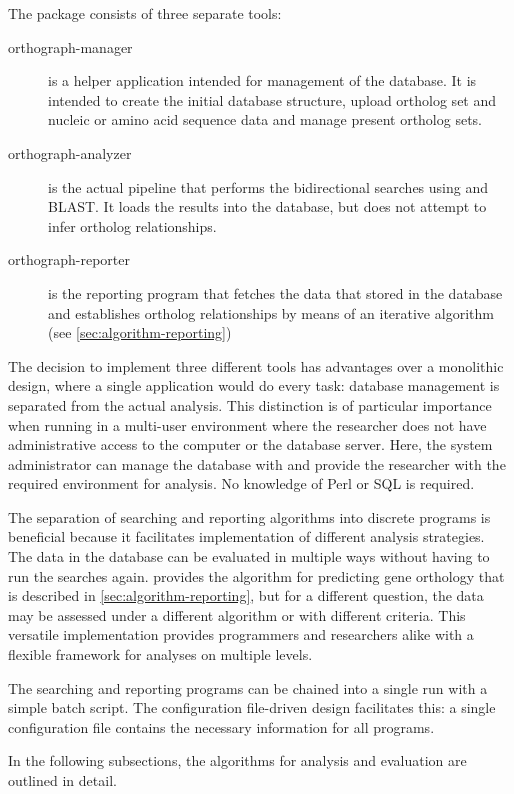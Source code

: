 \label{sec:algorithm}
The \pname package consists of three separate tools:

\begin{description}
	\item[orthograph-manager] is a helper application intended for management of
		the database. It is intended to create the initial database structure, upload
		ortholog set and nucleic or amino acid sequence data and manage present
		ortholog sets.
	\item[orthograph-analyzer] is the actual pipeline that performs the
		bidirectional searches using  and BLAST. It loads the
		results into the database, but does not attempt to infer ortholog
		relationships. 
	\item[orthograph-reporter] is the reporting program that fetches the data that
		 stored in the database and establishes ortholog
		relationships by means of an iterative algorithm (see
		\autoref{sec:algorithm-reporting})
\end{description}

The decision to implement three different tools  has advantages over a
monolithic design, where a single application would do every task: database
management is separated from the actual analysis. This distinction is of
particular importance when running \pname in a multi-user environment where the
researcher does not have administrative access to the computer or the database
server. Here, the system administrator can manage the database with
 and provide the researcher with the required
environment for analysis. No knowledge of Perl or SQL is required.

The separation of searching and reporting algorithms into discrete programs is
beneficial because it facilitates implementation of different analysis
strategies. The data in the database can be evaluated in multiple ways without
having to run the searches again.  provides the algorithm for
predicting gene orthology that is described in
\autoref{sec:algorithm-reporting}, but for a different question, the data may be
assessed under a different algorithm or with different criteria. This versatile
implementation provides programmers and researchers alike with a flexible
framework for analyses on multiple levels. 

The searching and reporting programs can be chained into a single run with a
simple batch script. The configuration file-driven design facilitates this: a
single configuration file contains the necessary information for all \pname
programs.

In the following subsections, the algorithms for analysis and evaluation are
outlined in detail.
